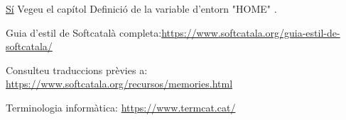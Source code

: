 \documentclass[9pt]{cheatsheet}
\begin{document}
\begin{multicols*}{3}
\underline {Sí} Vegeu el capítol \guillemotleft Definició de la variable d'entorn "HOME" \guillemotright.


Guia d'estil de Softcatalà completa:\url{https://www.softcatala.org/guia-estil-de-softcatala/}

Consulteu traduccions prèvies a: \url{https://www.softcatala.org/recursos/memories.html}

Terminologia informàtica: \url{https://www.termcat.cat/}

\end{multicols*}
\end{document}
